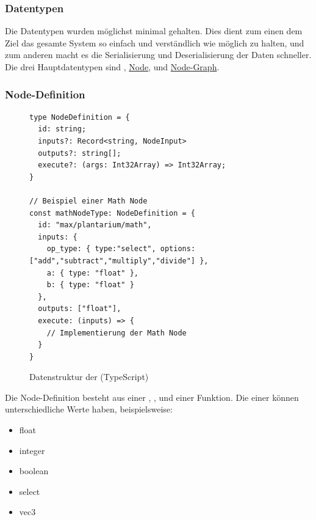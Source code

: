 \documentclass[ngerman]{article}
\begin{document}
\pagebreak

\subsubsection{Datentypen}

Die Datentypen wurden möglichst minimal gehalten. Dies dient zum einen dem Ziel das gesamte System so einfach und verständlich wie möglich zu halten, und zum
anderen macht es die Serialisierung und Deserialisierung der Daten schneller.
\br
Die drei Hauptdatentypen sind  , \hyperref[fig:data_node]{Node},  und \hyperref[fig:data_node_graph]{Node-Graph}. 

\subsubsection*{Node-Definition}

\begin{figure}[htbp]
  \begin{code}
    \begin{verbatim}
type NodeDefinition = {
  id: string;
  inputs?: Record<string, NodeInput>
  outputs?: string[];
  execute?: (args: Int32Array) => Int32Array;
}

// Beispiel einer Math Node
const mathNodeType: NodeDefinition = {
  id: "max/plantarium/math",
  inputs: { 
    op_type: { type:"select", options: ["add","subtract","multiply","divide"] }, 
    a: { type: "float" }, 
    b: { type: "float" } 
  },
  outputs: ["float"],
  execute: (inputs) => {
    // Implementierung der Math Node
  }
}
    \end{verbatim}
  \end{code}

  \caption{Datenstruktur der  (TypeScript)}
  \label{sec:data_node_type}

\end{figure}

Die Node-Definition besteht aus einer , ,  und einer  Funktion. Die  einer  können unterschiedliche  Werte haben, beispielsweise:

\begin{itemize}
  \setlength\itemsep{0.0em}
  \item float
  \item integer
  \item boolean
  \item select
  \item vec3
\end{itemize}
\end{document}
